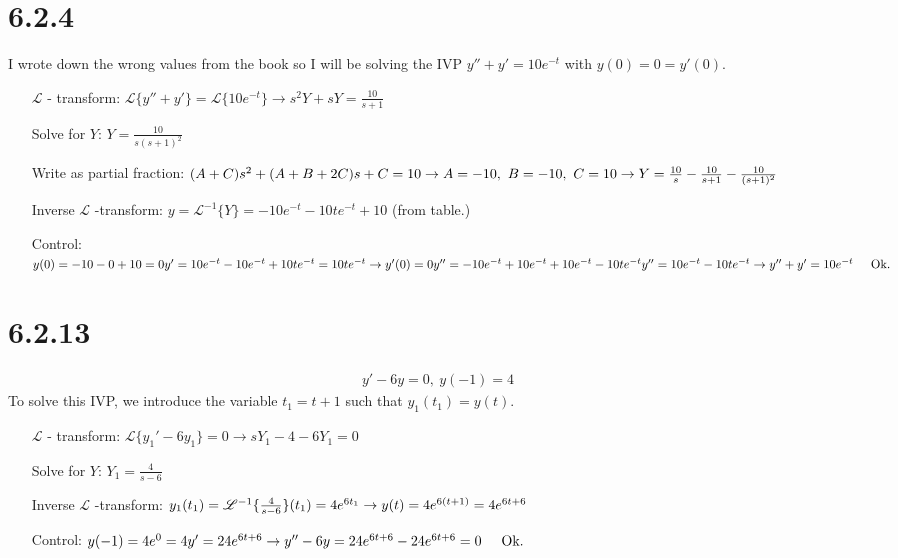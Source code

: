 \documentclass[11pt,a4paper]{article}
\newcommand{\Laplace}{\mathscr{L}}
\begin{document}
\section*{6.2.4}
I wrote down the wrong values from the book so I will be solving the IVP $y'' + y' = 10e^{-t}$ with $y(0) = 0 = y'(0)$. \\
\begin{itemize}[leftmargin=4.0cm,labelsep=0.5cm]
\item[$\Laplace$ - transform:]
	$\Laplace\{y''+y'\} = \Laplace\{10e^{-t}\}
	\rightarrow s^2 Y + sY = \frac{10}{s+1}$
\item[Solve for $Y$:]
	$Y = \frac{10}{s(s+1)^2}$
\item[Write as partial fraction:]
	$(A+C)s^2 + (A+B+2C)s + C = 10 \\
	\rightarrow A=-10,\ B=-10,\ C = 10 \\
	\rightarrow Y = \frac{10}{s} - \frac{10}{s+1} - \frac{10}{(s+1)^2}$
\item[Inverse $\Laplace$ -transform:]
	$ y = \Laplace^{-1}\{Y\} = -10e^{-t} - 10te^{-t} + 10$ (from table.)
\item[Control:]
	$ y(0) = -10 - 0 + 10 = 0 \\
	y' = 10e^{-t} - 10e^{-t} + 10te^{-t} = 10te^{-t} \\
	\rightarrow y'(0) = 0 \\
	y'' = - 10e^{-t} + 10e^{-t} + 10e^{-t} - 10te^{-t} \\
	y'' = 10e^{-t} - 10te^{-t} \\
	\rightarrow y'' + y' = 10e^{-t} \hspace*{0.5cm} \text{Ok.}$
\end{itemize}

\section*{6.2.13}
\begin{align*}
	y' - 6y = 0,\ y(-1) = 4
\end{align*}
To solve this IVP, we introduce the variable $t_1 = t + 1$ such that $y_1(t_1) = y(t)$.
\begin{itemize}[leftmargin=4.0cm,labelsep=0.5cm]
\item[$\Laplace$ - transform:]
	$\Laplace\{y_1' - 6y_1\} = 0
	\rightarrow sY_1 - 4 - 6Y_1 = 0$
\item[Solve for $Y$:]
	$Y_1 = \frac{4}{s-6}$
\item[Inverse $\Laplace$ -transform:]
	$y_1(t_1) = \Laplace^{-1}\{\frac{4}{s-6}\}(t_1) = 4e^{6t_1} \\
	\rightarrow y(t) = 4e^{6(t+1)} = 4e^{6t+6}$
\item[Control:]
	$y(-1) = 4e^0 = 4 \\
	y' = 24e^{6t+6} \\
	\rightarrow y'' - 6y = 24e^{6t+6} - 24e^{6t+6} = 0 
	\hspace*{0.5cm} \text{Ok.}$
\end{itemize}
\end{document}
